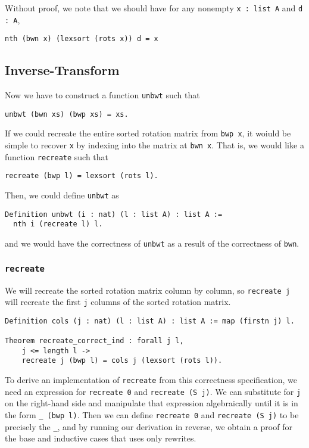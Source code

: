 \documentclass[11pt]{article}
\begin{document}
Without proof, we note that we should have for any nonempty
\verb|x : list A| and \verb|d : A|,
\begin{verbatim}
nth (bwn x) (lexsort (rots x)) d = x
\end{verbatim}

\subsection{Inverse-Transform}
\label{subsec:invt}

Now we have to construct a function \verb|unbwt| such that
\begin{verbatim}
unbwt (bwn xs) (bwp xs) = xs.
\end{verbatim}
If we could recreate the entire sorted rotation matrix from
\verb|bwp x|, it woiuld be simple to recover \verb|x| by indexing into
the matrix at \verb|bwn x|. That is, we would like a function
\verb|recreate| such that
\begin{verbatim}
recreate (bwp l) = lexsort (rots l).
\end{verbatim}

Then, we could define \verb|unbwt| as
\begin{verbatim}
Definition unbwt (i : nat) (l : list A) : list A :=
  nth i (recreate l) l.
\end{verbatim}
and we would have the correctness of \verb|unbwt| as a result of the
correctness of \verb|bwn|.

\subsubsection{\texttt{recreate}}
We will recreate the sorted rotation matrix column by column, so
\verb|recreate j| will recreate the first \verb|j| columns of the sorted
rotation matrix.
\begin{verbatim}
Definition cols (j : nat) (l : list A) : list A := map (firstn j) l.

Theorem recreate_correct_ind : forall j l,
    j <= length l ->
    recreate j (bwp l) = cols j (lexsort (rots l)).
\end{verbatim}

To derive an implementation of \verb|recreate| from this correctness
specification, we need an expression for \verb|recreate 0| and
\verb|recreate (S j)|. We can substitute for \verb|j| on the
right-hand side and manipulate that expression algebraically until it
is in the form \verb|_ (bwp l)|. Then we can define \verb|recreate 0|
and \verb|recreate (S j)| to be precisely the \verb|_|, and by
running our derivation in reverse, we obtain a proof for the base and
inductive cases that uses only rewrites.
\end{document}
